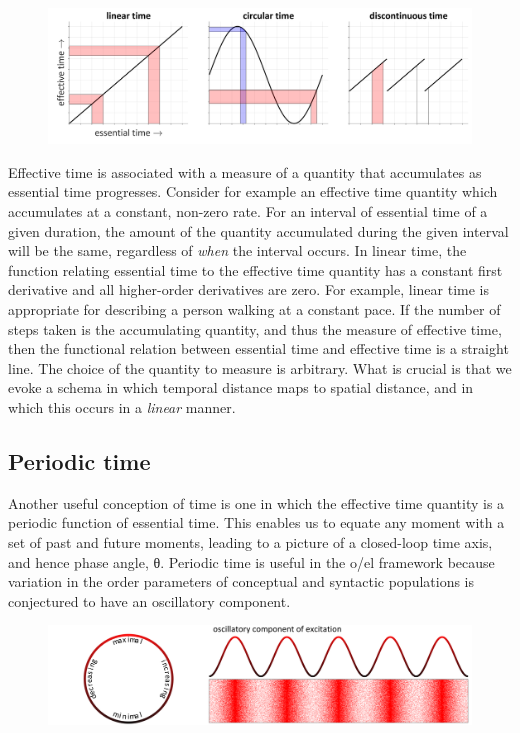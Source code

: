   
\begin{figure}
\includegraphics[width=\textwidth]{figures/Tilsen-img45.png}
\caption{\missingcaption}
\label{fig:}
\end{figure}
 

  Effective time is associated with a measure of a quantity that accumulates as essential time progresses. Consider for example an effective time quantity which accumulates at a constant, non-zero rate. For an interval of essential time of a given duration, the amount of the quantity accumulated during the given interval will be the same, regardless of \textit{when} the interval occurs. In linear time, the function relating essential time to the effective time quantity has a constant first derivative and all higher-order derivatives are zero. For example, linear time is appropriate for describing a person walking at a constant pace. If the number of steps taken is the accumulating quantity, and thus the measure of effective time, then the functional relation between essential time and effective time is a straight line. The choice of the quantity to measure is arbitrary. What is crucial is that we evoke a schema in which temporal distance maps to spatial distance, and in which this occurs in a \textit{linear} manner.

\subsection{Periodic time}

Another useful conception of time is one in which the effective time quantity is a periodic function of  essential time. This enables us to equate any moment with a set of past and future moments, leading to a picture of a closed-loop time axis, and hence phase angle, θ. Periodic time is useful in the o/el framework because variation in the order parameters of conceptual and syntactic populations is conjectured to have an oscillatory component.

  
\begin{figure}
\includegraphics[width=\textwidth]{figures/Tilsen-img46.png}
\caption{\missingcaption}
\label{fig:}
\end{figure}
 

